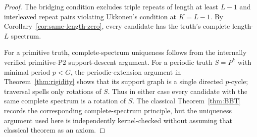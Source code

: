 \begin{proof}
The bridging condition excludes triple repeats of length at least $L-1$
and interleaved repeat pairs violating Ukkonen's condition at $K=L-1$.
By Corollary~\ref{cor:same-length-zero}, every candidate has the
truth's complete length-$L$ spectrum.

For a primitive truth, complete-spectrum uniqueness follows from
the internally verified primitive-P2 support-descent argument.
For a periodic truth $S=P^k$ with minimal period $p<G$, the
periodic-extension argument in Theorem~\ref{thm:rigidity} shows
that its support graph is a single directed $p$-cycle; traversal
spells only rotations of $S$. Thus in either case every candidate
with the same complete spectrum is a rotation of $S$.
The classical Theorem~\ref{thm:BBT} records the corresponding
complete-spectrum principle, but the uniqueness argument
used here is independently kernel-checked without assuming
that classical theorem as an axiom.
\end{proof}


